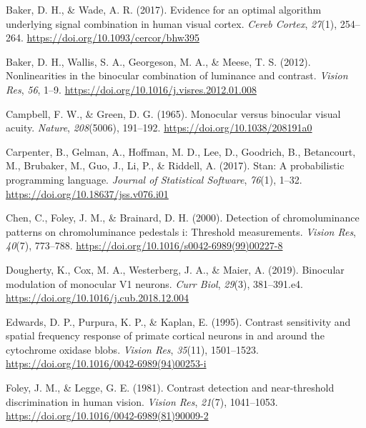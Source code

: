 \documentclass[
  letterpaper,
  DIV=11,
  numbers=noendperiod]{scrartcl}
\newlength{\cslhangindent}
\newlength{\cslentryspacingunit} %
\newenvironment{CSLReferences}[2] %
 {%
  \setlength{\parindent}{0pt}
  \ifodd #1
  \let\oldpar\par
  \def\par{\hangindent=\cslhangindent\oldpar}
  \fi
  \setlength{\parskip}{#2\cslentryspacingunit}
 }%
 {}
\begin{document}
\begin{CSLReferences}{1}{0}
\leavevmode{}%
Baker, D. H., \& Wade, A. R. (2017). Evidence for an optimal algorithm
underlying signal combination in human visual cortex. \emph{Cereb
Cortex}, \emph{27}(1), 254--264.
\url{https://doi.org/10.1093/cercor/bhw395}

\leavevmode{}%
Baker, D. H., Wallis, S. A., Georgeson, M. A., \& Meese, T. S. (2012).
Nonlinearities in the binocular combination of luminance and contrast.
\emph{Vision Res}, \emph{56}, 1--9.
\url{https://doi.org/10.1016/j.visres.2012.01.008}

\leavevmode{}%
Campbell, F. W., \& Green, D. G. (1965). Monocular versus binocular
visual acuity. \emph{Nature}, \emph{208}(5006), 191--192.
\url{https://doi.org/10.1038/208191a0}

\leavevmode{}%
Carpenter, B., Gelman, A., Hoffman, M. D., Lee, D., Goodrich, B.,
Betancourt, M., Brubaker, M., Guo, J., Li, P., \& Riddell, A. (2017).
Stan: A probabilistic programming language. \emph{Journal of Statistical
Software}, \emph{76}(1), 1--32.
\url{https://doi.org/10.18637/jss.v076.i01}

\leavevmode{}%
Chen, C., Foley, J. M., \& Brainard, D. H. (2000). Detection of
chromoluminance patterns on chromoluminance pedestals i: Threshold
measurements. \emph{Vision Res}, \emph{40}(7), 773--788.
\url{https://doi.org/10.1016/s0042-6989(99)00227-8}

\leavevmode{}%
Dougherty, K., Cox, M. A., Westerberg, J. A., \& Maier, A. (2019).
Binocular modulation of monocular V1 neurons. \emph{Curr Biol},
\emph{29}(3), 381--391.e4.
\url{https://doi.org/10.1016/j.cub.2018.12.004}

\leavevmode{}%
Edwards, D. P., Purpura, K. P., \& Kaplan, E. (1995). Contrast
sensitivity and spatial frequency response of primate cortical neurons
in and around the cytochrome oxidase blobs. \emph{Vision Res},
\emph{35}(11), 1501--1523.
\url{https://doi.org/10.1016/0042-6989(94)00253-i}

\leavevmode{}%
Foley, J. M., \& Legge, G. E. (1981). Contrast detection and
near-threshold discrimination in human vision. \emph{Vision Res},
\emph{21}(7), 1041--1053.
\url{https://doi.org/10.1016/0042-6989(81)90009-2}


\end{CSLReferences}
\end{document}
